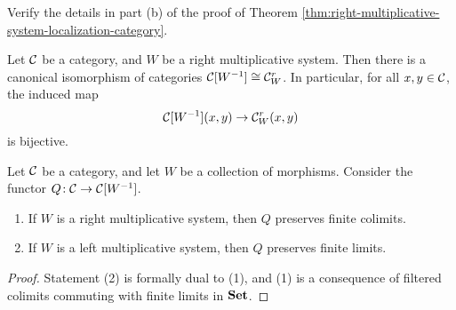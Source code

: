 \begin{exercise}
	Verify the details in part (b) of the proof of Theorem \ref{thm:right-multiplicative-system-localization-category}.
\end{exercise}
\begin{corollary}
	Let \(\mathcal{C}\) be a category, and \(W\) be a right multiplicative system. Then there is a canonical isomorphism of categories \(\mathcal{C}[W^{-1}]\cong\mathcal{C}_W^r\). In particular,
	for all \(x,y\in\mathcal{C}\), the induced map
	\[ \mathcal{C}[W^{-1}](x,y) \to \mathcal{C}_W^r(x,y) \]
	is bijective.%
\end{corollary}
\begin{corollary}
	Let \(\mathcal{C}\) be a category, and let \(W\) be a collection of morphisms. Consider the functor \(Q\!:\mathcal{C}\to\mathcal{C}[W^{-1}]\).
	\begin{enumerate}[label=(\arabic*)]
	\item If \(W\) is a right multiplicative system, then \(Q\) preserves finite colimits.
	\item If \(W\) is a left multiplicative system, then \(Q\) preserves finite limits.
	\end{enumerate}
\end{corollary}
\begin{proof}
Statement (2) is formally dual to (1), and (1) is a consequence of filtered colimits commuting with finite limits in \(\mathbf{Set}\).
\end{proof}


